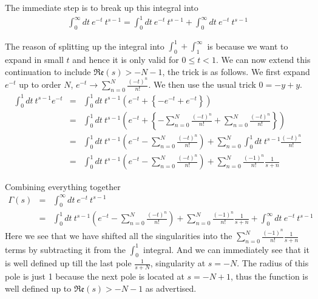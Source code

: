 \documentclass[aps,preprint,preprintnumbers,nofootinbib,showpacs,prd]{revtex4-1}
\newcommand{\bea}{\begin{eqnarray}}
\newcommand{\eea}{\end{eqnarray}}
\newcommand{\nbea}{\begin{eqnarray*}}
\newcommand{\neea}{\end{eqnarray*}}
\begin{document}
The immediate step is to break up this integral into
%
\nbea
\int_0^\infty dt ~ e^{-t}~t^{s-1} = \int_0^1 dt ~ e^{-t}~t^{s-1} + \int_0^\infty dt ~ e^{-t}~t^{s-1}
\neea
%

The reason of splitting up the integral into $\int_0^1 + \int_1^\infty$ is because we want to expand in small $t$ and hence it is only valid for $0 \leq t < 1$. We can now extend this continuation to include $\mathfrak{Re}(s) > - N - 1$, the trick is as follows. We first expand $e^{-t}$ up to order $N$, $e^{-t} \rightarrow \sum\limits_{n=0}^{N} \frac{(-t)^n}{n!}$. We then use the usual trick $0 = -y + y$.
%
\nbea
\int_0^1 dt ~ t^{s-1} e^{-t} & = & \int_0^1 dt ~ t^{s-1} \left ( e^{-t} + \left \{-e^{-t} + e^{-t} \right \} \right ) \\
& = & \int_0^1 dt ~ t^{s-1} \left ( e^{-t} + \left \{-\sum\limits_{n=0}^{N} \frac{(-t)^n}{n!} + \sum\limits_{n=0}^{N} \frac{(-t)^n}{n!} \right \} \right ) \\
& = & \int_0^1 dt ~ t^{s-1} \left ( e^{-t} -\sum\limits_{n=0}^{N} \frac{(-t)^n}{n!} \right )  + \sum\limits_{n=0}^{N} \int_0^1 dt ~ t^{s-1} \frac{(-t)^n}{n!} \\
& = & \int_0^1 dt ~ t^{s-1} \left ( e^{-t} -\sum\limits_{n=0}^{N} \frac{(-t)^n}{n!} \right )  + \sum\limits_{n=0}^{N} \frac{(-1)^n}{n!} \frac{1}{s+n} 
\neea
%

Combining everything together
%
\bea
\Gamma(s) & = & \int_0^\infty dt ~ e^{-t}~t^{s-1} \nonumber \\
& = & \int_0^1 dt ~ t^{s-1} \left ( e^{-t} -\sum\limits_{n=0}^{N} \frac{(-t)^n}{n!} \right )  + \sum\limits_{n=0}^{N} \frac{(-1)^n}{n!} \frac{1}{s+n} + \int_0^\infty dt ~ e^{-t}~t^{s-1}
\label{Eq:Prob3.6}
\eea
%
Here we see that we have shifted all the singularities into the $\sum\limits_{n=0}^{N} \frac{(-1)^n}{n!} \frac{1}{s+n}$ terms by subtracting it from the $\int_0^1$ integral. And we can immediately see that it is well defined up till the last pole $\frac{1}{s + N}$, singularity at $s = -N$. The radius of this pole is just 1 because the next pole is located at $s = -N + 1$, thus the function is well defined up to $\mathfrak{Re}(s) > - N - 1$ as advertised.
\end{document}
